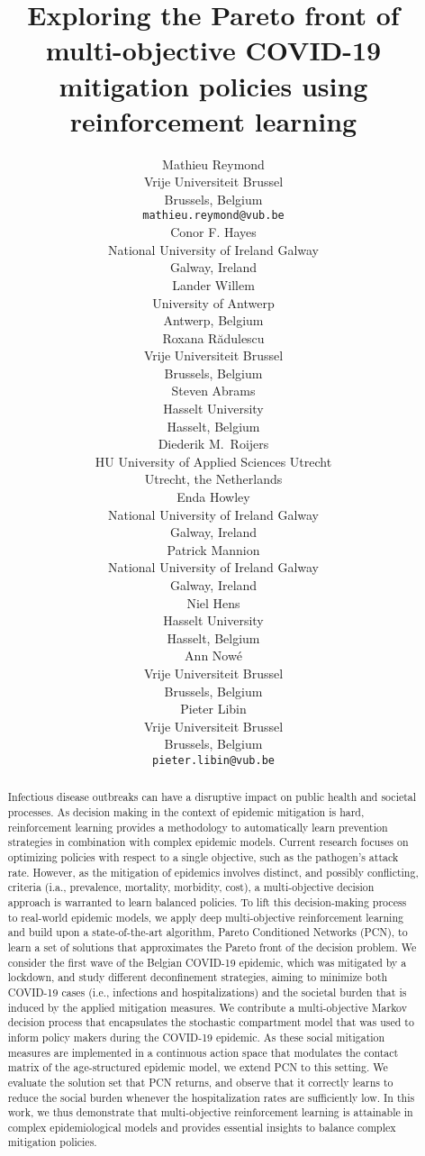 \documentclass{article}
\title{Exploring the Pareto front of multi-objective COVID-19 mitigation policies using reinforcement learning}
\date{}
\author{Mathieu Reymond \\
	Vrije Universiteit Brussel\\
	Brussels, Belgium \\
	\texttt{mathieu.reymond@vub.be} \\
	\And
	Conor F. Hayes \\
	National University of Ireland Galway\\
	Galway, Ireland\\
	\And
	Lander Willem \\
	University of Antwerp \\
	Antwerp, Belgium \\
	\And
	Roxana R\u{a}dulescu \\
	Vrije Universiteit Brussel\\
	Brussels, Belgium \\
	\And
	Steven Abrams \\
	Hasselt University \\
	Hasselt, Belgium \\
	\And
	Diederik M.\ Roijers \\
	HU University of Applied Sciences Utrecht \\
	Utrecht, the Netherlands \\
	\And
	Enda Howley \\
	National University of Ireland Galway\\
	Galway, Ireland\\
	\And
	Patrick Mannion \\
	National University of Ireland Galway\\
	Galway, Ireland\\
	\And
	Niel Hens \\
	Hasselt University \\
	Hasselt, Belgium \\
	\And
	Ann Now\'{e} \\
	Vrije Universiteit Brussel\\
	Brussels, Belgium \\
	\And
	Pieter Libin \\
	Vrije Universiteit Brussel\\
	Brussels, Belgium \\
    \texttt{pieter.libin@vub.be} \\
}
\begin{document}
\maketitle

\begin{abstract}
Infectious disease outbreaks can have a disruptive impact on public health and societal processes. As decision making in the context of epidemic mitigation is hard, reinforcement learning provides a methodology to automatically learn prevention strategies in combination with complex epidemic models. Current research focuses on optimizing policies with respect to a single objective, such as the pathogen's attack rate. However, as the mitigation of epidemics involves distinct, and possibly conflicting, criteria (i.a., prevalence, mortality, morbidity, cost), a multi-objective decision approach is warranted to learn balanced policies. To lift this decision-making process to real-world epidemic models, we apply deep multi-objective reinforcement learning and build upon a state-of-the-art algorithm, Pareto Conditioned Networks (PCN), to learn a set of solutions that approximates the Pareto front of the decision problem. We consider the first wave of the Belgian COVID-19 epidemic, which was mitigated by a lockdown, and study different deconfinement strategies, aiming to minimize both COVID-19 cases (i.e., infections and hospitalizations) and the societal burden that is induced by the applied mitigation measures. We contribute a multi-objective Markov decision process that encapsulates the stochastic compartment model that was used to inform policy makers during the COVID-19 epidemic. As these social mitigation measures are implemented in a continuous action space that modulates the contact matrix of the age-structured epidemic model, we extend PCN to this setting. We evaluate the solution set that PCN returns, and observe that it correctly learns to reduce the social burden whenever the hospitalization rates are sufficiently low. In this work, we thus demonstrate that multi-objective reinforcement learning is attainable in complex epidemiological models and provides essential insights to balance complex mitigation policies.
\end{abstract}



\end{document}
